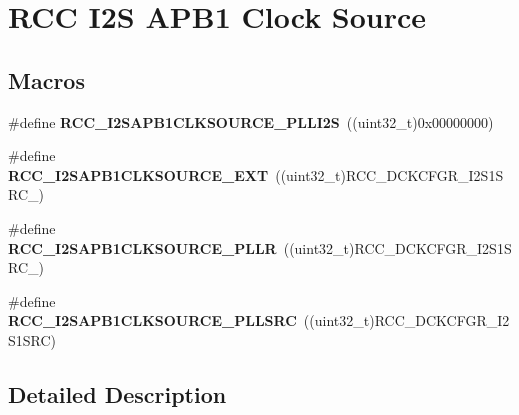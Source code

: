\hypertarget{group___r_c_c_ex___i2_s_a_p_b1___clock___source}{}\section{R\+CC I2S A\+P\+B1 Clock Source}
\label{group___r_c_c_ex___i2_s_a_p_b1___clock___source}
\subsection*{Macros}
\begin{DoxyCompactItemize}
\item 
\#define {\bfseries R\+C\+C\+\_\+\+I2\+S\+A\+P\+B1\+C\+L\+K\+S\+O\+U\+R\+C\+E\+\_\+\+P\+L\+L\+I2S}~((uint32\+\_\+t)0x00000000)\hypertarget{group___r_c_c_ex___i2_s_a_p_b1___clock___source_gae1c55724eb2df22be0fa032cddca6485}{}\label{group___r_c_c_ex___i2_s_a_p_b1___clock___source_gae1c55724eb2df22be0fa032cddca6485}

\item 
\#define {\bfseries R\+C\+C\+\_\+\+I2\+S\+A\+P\+B1\+C\+L\+K\+S\+O\+U\+R\+C\+E\+\_\+\+E\+XT}~((uint32\+\_\+t)R\+C\+C\+\_\+\+D\+C\+K\+C\+F\+G\+R\+\_\+\+I2\+S1\+S\+R\+C\+\_)\hypertarget{group___r_c_c_ex___i2_s_a_p_b1___clock___source_ga1d439819ca686328724d6cc1a171d52b}{}\label{group___r_c_c_ex___i2_s_a_p_b1___clock___source_ga1d439819ca686328724d6cc1a171d52b}

\item 
\#define {\bfseries R\+C\+C\+\_\+\+I2\+S\+A\+P\+B1\+C\+L\+K\+S\+O\+U\+R\+C\+E\+\_\+\+P\+L\+LR}~((uint32\+\_\+t)R\+C\+C\+\_\+\+D\+C\+K\+C\+F\+G\+R\+\_\+\+I2\+S1\+S\+R\+C\+\_)\hypertarget{group___r_c_c_ex___i2_s_a_p_b1___clock___source_ga168da85f7dfdcca6b3ed2ce13876fcaa}{}\label{group___r_c_c_ex___i2_s_a_p_b1___clock___source_ga168da85f7dfdcca6b3ed2ce13876fcaa}

\item 
\#define {\bfseries R\+C\+C\+\_\+\+I2\+S\+A\+P\+B1\+C\+L\+K\+S\+O\+U\+R\+C\+E\+\_\+\+P\+L\+L\+S\+RC}~((uint32\+\_\+t)R\+C\+C\+\_\+\+D\+C\+K\+C\+F\+G\+R\+\_\+\+I2\+S1\+S\+RC)\hypertarget{group___r_c_c_ex___i2_s_a_p_b1___clock___source_ga9f3bb07a6c19c8ffaeb4e8e1bd3f8194}{}\label{group___r_c_c_ex___i2_s_a_p_b1___clock___source_ga9f3bb07a6c19c8ffaeb4e8e1bd3f8194}

\end{DoxyCompactItemize}


\subsection{Detailed Description}
